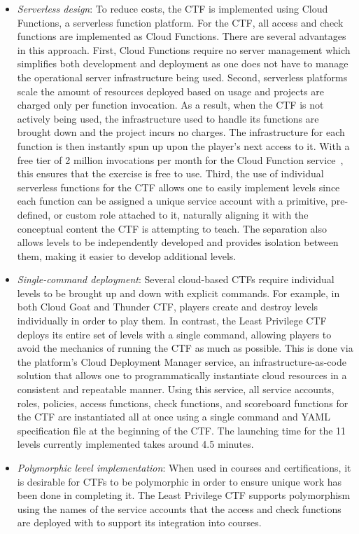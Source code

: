\begin{itemize}
  \item {\em Serverless design}: To reduce costs, the CTF is implemented using Cloud Functions, a serverless function platform.  For the CTF, all access and check functions are implemented as Cloud Functions.  There are several advantages in this approach.  First, Cloud Functions require no server management which
  simplifies both development and deployment as one does not have to manage the operational server infrastructure being used.  Second, serverless platforms
  scale the amount of resources deployed based on usage and projects are charged only per function invocation.  As a result, when the CTF is not actively being used, the infrastructure used to handle its functions are brought down and
  the project incurs no charges.  The infrastructure for each function is then instantly spun up upon the player's next access to it.
  With a free tier of 2 million invocations per month for the Cloud Function service~\cite{https://cloud.google.com/free}, this ensures that the exercise
  is free to use.  Third, the use of individual serverless functions for the CTF allows one to easily implement levels since each function can be assigned
  a unique service account with a primitive, pre-defined, or custom role attached to it, naturally aligning it with the conceptual content the CTF is attempting to teach.  The separation also allows levels to be independently developed and provides isolation between them, making it easier to develop additional levels.

  \item {\em Single-command deployment}: Several cloud-based CTFs require individual levels to be brought up and down with explicit commands.  For example, in both Cloud Goat and Thunder CTF, players create and destroy levels individually in order to play them.  In contrast, the Least Privilege CTF deploys its entire set of levels with a single command, allowing players to avoid the mechanics of running the CTF as much as possible.  This is done via the platform's Cloud Deployment
  Manager service, an infrastructure-as-code solution that allows one to programmatically instantiate cloud resources in a consistent and repeatable manner.  Using
  this service, all service accounts, roles, policies, access functions, check functions, and scoreboard functions for the CTF are instantiated all at once using
  a single command and YAML specification file at the beginning of the CTF.  The launching time for the 11 levels currently implemented takes around 4.5 minutes.
  \item {\em Polymorphic level implementation}: When used in courses and certifications, it is desirable for CTFs to be polymorphic in order to ensure unique 
  work has been done in completing it.  The Least Privilege CTF supports polymorphism using the names of the service accounts that the access and check 
  functions are deployed with to support its integration into courses. 
\end{itemize}

